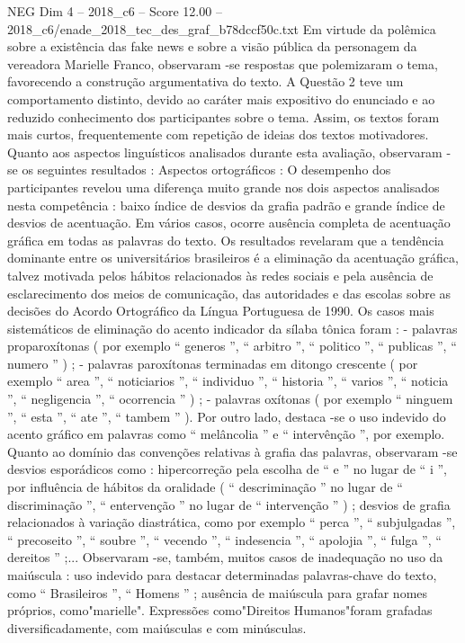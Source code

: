 \begin{textsample}{NEG Dim 4 – 2018\_c6 – Score 12.00 – 2018\_c6/enade\_2018\_tec\_des\_graf\_b78dccf50c.txt}
Em virtude da polêmica sobre a existência das fake news e sobre a visão pública da personagem da vereadora Marielle Franco, observaram -se respostas que polemizaram o tema, favorecendo a construção argumentativa do texto.
A Questão 2 teve um comportamento distinto, devido ao caráter mais expositivo do enunciado e ao reduzido conhecimento dos participantes sobre o tema.
Assim, os textos foram mais curtos, frequentemente com repetição de ideias dos textos motivadores.
Quanto aos aspectos linguísticos analisados durante esta avaliação, observaram -se os seguintes resultados : Aspectos ortográficos : O desempenho dos participantes revelou uma diferença muito grande nos dois aspectos analisados nesta competência : baixo índice de desvios da grafia padrão e grande índice de desvios de acentuação.
Em vários casos, ocorre ausência completa de acentuação gráfica em todas as palavras do texto.
Os resultados revelaram que a tendência dominante entre os universitários brasileiros é a eliminação da acentuação gráfica, talvez motivada pelos hábitos relacionados às redes sociais e pela ausência de esclarecimento dos meios de comunicação, das autoridades e das escolas sobre as decisões do Acordo Ortográfico da Língua Portuguesa de 1990.
Os casos mais sistemáticos de eliminação do acento indicador da sílaba tônica foram : - palavras proparoxítonas ( por exemplo “ generos ”, “ arbitro ”, “ politico ”, “ publicas ”, “ numero ” ) ; - palavras paroxítonas terminadas em ditongo crescente ( por exemplo “ area ”, “ noticiarios ”, “ individuo ”, “ historia ”, “ varios ”, “ noticia ”, “ negligencia ”, “ ocorrencia ” ) ; - palavras oxítonas ( por exemplo “ ninguem ”, “ esta ”, “ ate ”, “ tambem ” ).
Por outro lado, destaca -se o uso indevido do acento gráfico em palavras como “ melâncolia ” e “ intervênção ”, por exemplo.
Quanto ao domínio das convenções relativas à grafia das palavras, observaram -se desvios esporádicos como : hipercorreção pela escolha de “ e ” no lugar de “ i ”, por influência de hábitos da oralidade ( “ descriminação ” no lugar de “ discriminação ”, “ entervenção ” no lugar de “ intervenção ” ) ; desvios de grafia relacionados à variação diastrática, como por exemplo “ perca ”, “ subjulgadas ”, “ precoseito ”, “ soubre ”, “ vecendo ”, “ indesencia ”, “ apolojia ”, “ fulga ”, “ dereitos ” ;...
Observaram -se, também, muitos casos de inadequação no uso da maiúscula : uso indevido para destacar determinadas palavras-chave do texto, como “ Brasileiros ”, “ Homens ” ; ausência de maiúscula para grafar nomes próprios, como"marielle".
Expressões como"Direitos Humanos"foram grafadas diversificadamente, com maiúsculas e com minúsculas.

\end{textsample}

